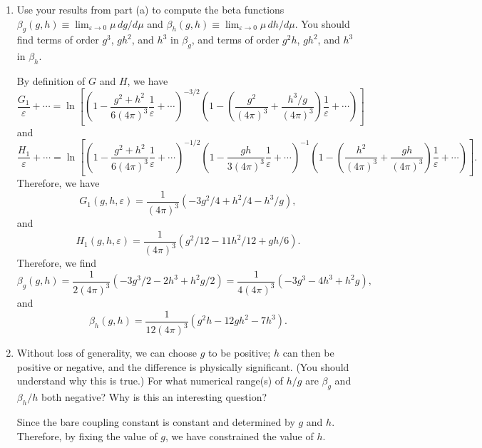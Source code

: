 \begin{enumerate}[label=\alph*)]
    \item Use your results from part (a) to compute the beta functions $\beta_g(g,h)\equiv\lim_{\varepsilon\to 0}\mu\,dg/d\mu$ and $\beta_h(g,h)\equiv\lim_{\varepsilon\to 0}\mu\,dh/d\mu$. You should find terms of order $g^3$, $gh^2$, and $h^3$ in $\beta_g$, and terms of order $g^2h$, $gh^2$, and $h^3$ in $\beta_h$.
    \begin{solution}
        By definition of $G$ and $H$, we have
        \begin{equation}
            \frac{G_1}{\varepsilon} + \cdots = \ln\left[\left(1 - \frac{g^2 + h^2}{6(4\pi)^3}\frac{1}{\varepsilon} + \cdots\right)^{-3/2}\left(1 - \left(\frac{g^2}{(4\pi)^3} + \frac{h^3/g}{(4\pi)^3}\right)\frac{1}{\varepsilon} + \cdots\right)\right]
        \end{equation}
        and
        \begin{equation}
            \frac{H_1}{\varepsilon} + \cdots = \ln\left[\left(1 - \frac{g^2 + h^2}{6(4\pi)^3}\frac{1}{\varepsilon} + \cdots\right)^{-1/2}\left(1 - \frac{gh}{3(4\pi)^3}\frac{1}{\varepsilon} + \cdots\right)^{-1}\left(1 - \left(\frac{h^2}{(4\pi)^3} + \frac{gh}{(4\pi)^3}\right)\frac{1}{\varepsilon} + \cdots\right)\right].
        \end{equation}
        Therefore, we have
        \begin{equation}
            G_1(g,h,\varepsilon) = \frac{1}{(4\pi)^3}(-3g^2/4 +h^2/4 -h^3/g),
        \end{equation}
        and
        \begin{equation}
            H_1(g,h,\varepsilon) = \frac{1}{(4\pi)^3}(g^2/12 - 11h^2/12+gh/6).
        \end{equation}
        Therefore, we find
        \begin{equation}
            \beta_g(g,h) = \frac{1}{2(4\pi)^3}(-3g^3/2 -2h^3+h^2g/2) = \frac{1}{4(4\pi)^3}(-3g^3 -4h^3+h^2g),
        \end{equation}
        and
        \begin{equation}
            \beta_h(g,h) = \frac{1}{12(4\pi)^3}(g^2h-12gh^2- 7h^3).
        \end{equation}
    \end{solution}

    \item Without loss of generality, we can choose $g$ to be positive; $h$ can then be positive or negative, and the difference is physically significant. (You should understand why this is true.) For what numerical range(s) of $h/g$ are $\beta_g$ and $\beta_h/h$ both negative? Why is this an interesting question?
    \begin{solution}
        Since the bare coupling constant is constant and determined by $g$ and $h$. Therefore, by fixing the value of $g$, we have constrained the value of $h$.


\end{solution}
\end{enumerate}
